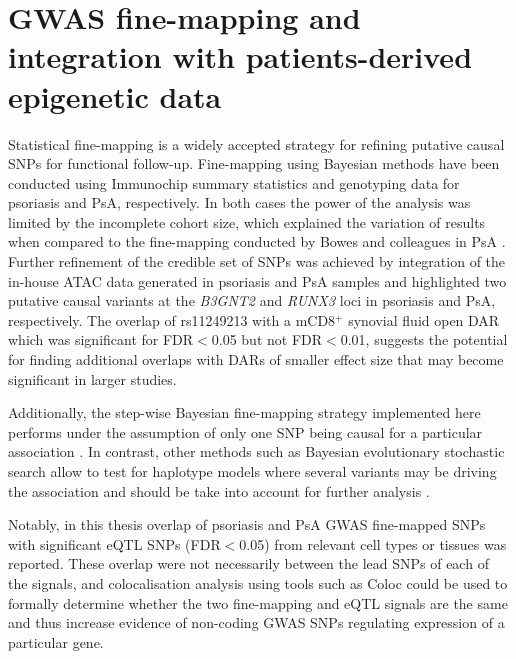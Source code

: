 \section{GWAS fine-mapping and integration with patients-derived epigenetic data}
Statistical fine-mapping is a widely accepted strategy for refining putative causal SNPs for functional follow-up. Fine-mapping using Bayesian methods have been conducted using Immunochip summary statistics and genotyping data for psoriasis and PsA, respectively. In both cases the power of the analysis was limited by the incomplete cohort size, which explained the variation of results when compared to the fine-mapping conducted by Bowes and colleagues in PsA \parencite{Bowes2015}. Further refinement of the credible set of SNPs was achieved by integration of the in-house ATAC data generated in psoriasis and PsA samples and highlighted two putative causal variants at the \textit{B3GNT2} and \textit{RUNX3} loci in psoriasis and PsA, respectively. The overlap of rs11249213 with a mCD8$^+$ synovial fluid open DAR which was significant for FDR$<$0.05 but not FDR$<$0.01, suggests the potential for finding additional overlaps with DARs of smaller effect size that may become significant in larger studies.

Additionally, the step-wise Bayesian fine-mapping strategy implemented here performs under the assumption of only one SNP being causal for a particular association \parencite{Maller2012,Bunt2015}. In contrast, other methods such as Bayesian evolutionary stochastic search allow to test for haplotype models where several variants may be driving the association \parencite{Wallace2015} and should be take into account for further analysis . 


Notably, in this thesis overlap of psoriasis and PsA GWAS fine-mapped SNPs with significant eQTL SNPs (FDR$<$0.05) from relevant cell types or tissues was reported. These overlap were not necessarily between the lead SNPs of each of the signals, and colocalisation analysis using tools such as Coloc \parencite{Giambartolomei2014} could be used to formally determine whether the two fine-mapping and eQTL signals are the same and thus increase evidence of non-coding GWAS SNPs regulating expression of a particular gene.




